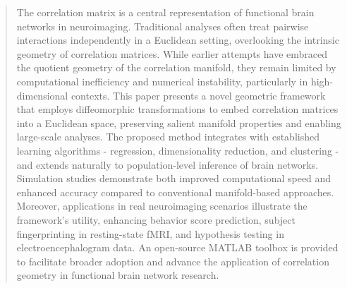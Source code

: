\documentclass[10pt]{article}
\begin{document}
\begin{abstract}
The correlation matrix is a central representation of functional brain networks in neuroimaging. Traditional analyses often treat pairwise interactions independently in a Euclidean setting, overlooking the intrinsic geometry of correlation matrices. While earlier attempts have embraced the quotient geometry of the correlation manifold, they remain limited by computational inefficiency and numerical instability, particularly in high-dimensional contexts. This paper presents a novel geometric framework that employs diffeomorphic transformations to embed correlation matrices into a Euclidean space, preserving salient manifold properties and enabling large-scale analyses. The proposed method integrates with established learning algorithms - regression, dimensionality reduction, and clustering - and extends naturally to population-level inference of brain networks. Simulation studies demonstrate both improved computational speed and enhanced accuracy compared to conventional manifold-based approaches. Moreover, applications in real neuroimaging scenarios illustrate the framework’s utility, enhancing behavior score prediction, subject fingerprinting in resting-state fMRI, and hypothesis testing in electroencephalogram data. An open-source MATLAB toolbox is provided to facilitate broader adoption and advance the application of correlation geometry in functional brain network research.
\end{abstract}
\end{document}
